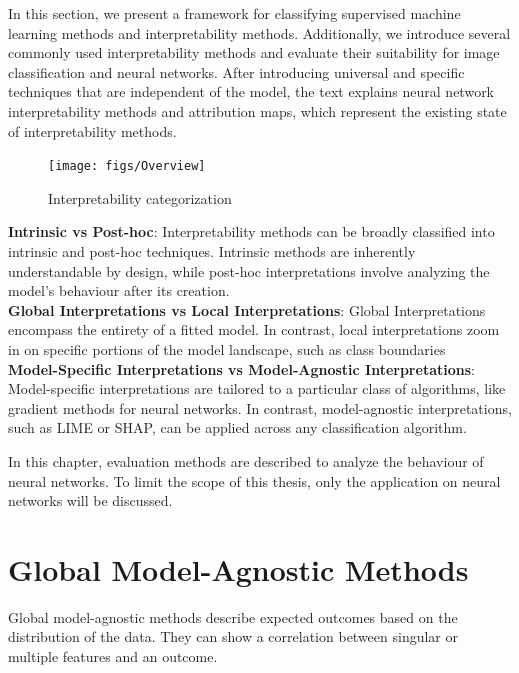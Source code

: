 In this section, we present a framework \cite{allen2023interpretable} for classifying supervised machine learning methods and interpretability methods. Additionally, we introduce several commonly used interpretability methods and evaluate their suitability for image classification and neural networks.  After introducing universal and specific techniques that are independent of the model, the text explains neural network interpretability methods and attribution maps, which represent the existing state of interpretability methods.


\begin{figure}[h!]
	\centering
	\texttt{[image: figs/Overview]}
	\caption[Interpretability categorization]{Interpretability categorization \cite{allen2023interpretable}}
	\label{fig:IML_Overview}
\end{figure}

\textbf{Intrinsic vs Post-hoc}: Interpretability methods can be broadly classified into intrinsic and post-hoc techniques. Intrinsic methods are inherently understandable by design, while post-hoc interpretations involve analyzing the model's behaviour after its creation.
\\
\textbf{Global Interpretations vs Local Interpretations}: Global Interpretations encompass the entirety of a fitted model. In contrast, local interpretations zoom in on specific portions of the model landscape, such as class boundaries
\\
\textbf{Model-Specific Interpretations vs Model-Agnostic Interpretations}: 
Model-specific interpretations are tailored to a particular class of algorithms, like gradient methods for neural networks. In contrast, model-agnostic interpretations, such as LIME or SHAP, can be applied across any classification algorithm.

In this chapter, evaluation methods are described to analyze the behaviour of neural networks. To limit the scope of this thesis, only the application on neural networks will be discussed.

\section{Global Model-Agnostic Methods}

Global model-agnostic methods describe expected outcomes based on the distribution of the data. They can show a correlation between singular or multiple features and an outcome.

